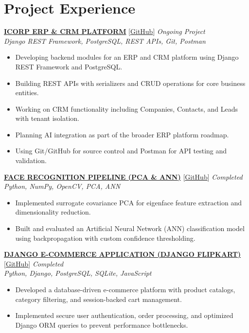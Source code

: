 \documentclass[a4paper,9pt]{article}
\begin{document}
\section*{Project Experience}
\href{https://github.com/shibinputhramannil/IcorpERP}{\textbf{ICORP ERP \& CRM PLATFORM}} [\href{https://github.com/shibinputhramannil/IcorpERP}{GitHub}] \hfill \textit{Ongoing Project}\\
\textit{Django REST Framework, PostgreSQL, REST APIs, Git, Postman}
\begin{itemize}
    \item Developing backend modules for an ERP and CRM platform using Django REST Framework and PostgreSQL.
    \item Building REST APIs with serializers and CRUD operations for core business entities.
    \item Working on CRM functionality including Companies, Contacts, and Leads with tenant isolation.
    \item Planning AI integration as part of the broader ERP platform roadmap.
    \item Using Git/GitHub for source control and Postman for API testing and validation.
\end{itemize}

\vspace{2pt}
\href{https://github.com/shibinputhramannil/Face_Recognition-PCA-ANN}{\textbf{FACE RECOGNITION PIPELINE (PCA \& ANN)}} [\href{https://github.com/shibinputhramannil/Face_Recognition-PCA-ANN}{GitHub}] \hfill \textit{Completed}\\
\textit{Python, NumPy, OpenCV, PCA, ANN}
\begin{itemize}
    \item Implemented surrogate covariance PCA for eigenface feature extraction and dimensionality reduction.
    \item Built and evaluated an Artificial Neural Network (ANN) classification model using backpropagation with custom confidence thresholding.
\end{itemize}

\vspace{2pt}
\href{https://github.com/shibinputhramannil}{\textbf{DJANGO E-COMMERCE APPLICATION (DJANGO FLIPKART)}} [\href{https://github.com/shibinputhramannil}{GitHub}] \hfill \textit{Completed}\\
\textit{Python, Django, PostgreSQL, SQLite, JavaScript}
\begin{itemize}
    \item Developed a database-driven e-commerce platform with product catalogs, category filtering, and session-backed cart management.
    \item Implemented secure user authentication, order processing, and optimized Django ORM queries to prevent performance bottlenecks.
\end{itemize}
\end{document}
